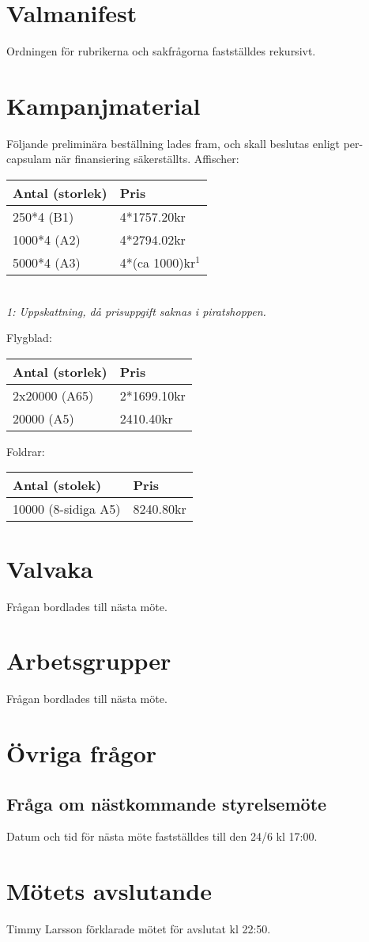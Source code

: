 \documentclass[a4paper,10pt]{article}
\begin{document}
\section{Valmanifest}
Ordningen för rubrikerna och sakfrågorna fastställdes rekursivt.

\section{Kampanjmaterial}
Följande preliminära beställning lades fram, och skall beslutas enligt per-capsulam när finansiering säkerställts.
Affischer:
\begin{center}
    \begin{tabular}{ | l | l |}
    \hline
	\textbf{Antal (storlek)} & \textbf{Pris} \\ \hline
    250*4 (B1)               & 4*1757.20kr \\ \hline
	1000*4 (A2)              & 4*2794.02kr \\ \hline
	5000*4 (A3)              & 4*(ca 1000)kr$^{1}$ \\
	\hline
    \end{tabular} \\
	\textit{1: Uppskattning, då prisuppgift saknas i piratshoppen.}
\end{center}

Flygblad:
\begin{center}
	\begin{tabular}{ | l | l |}
	\hline
	\textbf{Antal (storlek)} & \textbf{Pris} \\ \hline
	2x20000 (A65)            & 2*1699.10kr \\ \hline
    20000 (A5)               & 2410.40kr \\
	\hline
	\end{tabular}
\end{center}

Foldrar:
\begin{center}
	\begin{tabular}{ | l | l |}
	\hline
	\textbf{Antal (stolek)} & \textbf{Pris} \\ \hline
    10000 (8-sidiga A5)     & 8240.80kr \\
	\hline
	\end{tabular}
\end{center}

\section{Valvaka}
Frågan bordlades till nästa möte.

\section{Arbetsgrupper}
Frågan bordlades till nästa möte.

\section{Övriga frågor}
\subsection*{Fråga om nästkommande styrelsemöte}
Datum och tid för nästa möte fastställdes till den 24/6 kl 17:00.

\section{Mötets avslutande}
Timmy Larsson förklarade mötet för avslutat kl 22:50.
\end{document}
